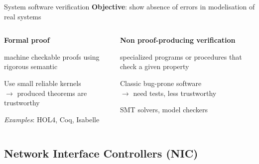 \documentclass[xcolor={x11names}]{beamer}
\begin{document}
\begin{frame}{System software verification}
    \textbf{Objective}: show absence of errors in modelisation of real systems
    \bigskip
    \pause

    \begin{columns}[T]
        \begin{column}{0.5\textwidth}
            \textbf{Formal proof \phantom{long long long title}}

            machine checkable proofs using rigorous semantic
            \phantom{needs 3 lines to align}

            \bigskip
            Use small reliable kernels \\
            $\rightarrow$ produced theorems are trustworthy

            \bigskip
            \textit{Examples}: HOL4, Coq, Isabelle

        \end{column}
        \pause
        \begin{column}{0.5\textwidth}
                \textbf{Non proof-producing verification}

                specialized programs or procedures that check a given property

            \bigskip
            Classic bug-prone software\\
            $\rightarrow$ need tests, less trustworthy \phantom{one more line}

            \bigskip
            SMT solvers, model checkers
        \end{column}
    \end{columns}

\end{frame}


\subsection{Network Interface Controllers (NIC)}
\end{document}
